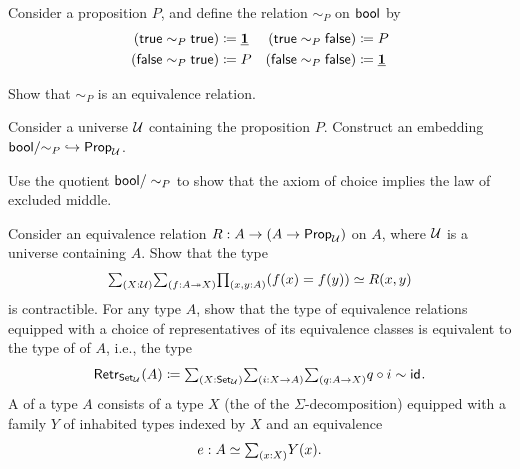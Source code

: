 \begin{exercises}
  \exitem Consider a proposition $P$, and define the relation $\sim_P$ on $\mathsf{bool}$ by
  \begin{align*}
    (\mathsf{true}\sim_P\mathsf{true}) & \coloneqq \underline{\mathbf{1}} & (\mathsf{true}\sim_P\mathsf{false}) & \coloneqq P \\
    (\mathsf{false}\sim_P\mathsf{true}) & \coloneqq P & (\mathsf{false}\sim_P\mathsf{false}) & \coloneqq \underline{\mathbf{1}}
  \end{align*}
  \begin{subexenum}
  \item  Show that $\sim_P$ is an equivalence relation.
  \item Consider a universe $\mathcal{U}$ containing the proposition $P$. Construct an embedding ${\mathsf{bool}/{\sim}_P}\hookrightarrow\mathsf{Prop}_{\mathcal{U}}$.  
  \item Use the quotient $\mathsf{bool}/\sim_P$ to show that the axiom of choice implies the law of excluded middle.
  \end{subexenum}
  \exitem Consider an equivalence relation $R:A\to(A\to\mathsf{Prop}_{\mathcal{U}})$ on $A$, where $\mathcal{U}$ is a universe containing $A$. Show that the type
  \begin{equation*}
    \sm{X:\UU}\sm{f:A\twoheadrightarrow X}\prd{x,y:A}(f(x)=f(y))\simeq R(x,y)
  \end{equation*}
  is contractible.
  \exitem For any type $A$, show that the type of equivalence relations equipped with a choice of representatives of its equivalence classes is equivalent to the type of  of $A$, i.e., the type
  \begin{equation*}
    \Retr_{\Set_\UU}(A) \defeq \sm{X:\Set_\UU}\sm{i:X\to A}\sm{q:A\to X} q\circ i\htpy \idfunc.
  \end{equation*}
  \exitem  \label{ex:sigmadecompositions}A  of a type $A$ consists of a type $X$ (the  of the $\Sigma$-decomposition) equipped with a family $Y$ of inhabited types indexed by $X$ and an equivalence
  \begin{equation*}
    e:A\simeq \sm{x:X}Y(x).
  \end{equation*}

\end{exercises}

